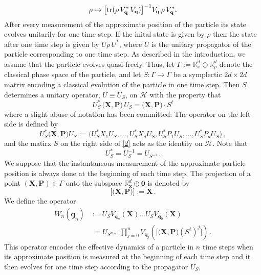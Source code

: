 \documentclass[12pt]{article}
\begin{document}
\begin{equation}\label{meas}
\rho \mapsto \big[ \text{tr}(\rho \,V_{\bf{q}}^{*}\, V_{\bf{q}})\big]^{-1} V_{\bf{q}}\, \rho\, V_{\bf{q}}^{*} .
\end{equation}
After every measurement of the approximate position of the particle its state evolves unitarily for one time step. If the 
inital state  is given by $\rho$ then the state after one time step is given by $U\rho\,U^{*}$, where $U$ is the unitary propagator of the particle corresponding to one time step. As described in the introduction, we assume that the particle evolves quasi-freely. Thus, let $\Gamma:= \mathbb{R}_{x}^{d}\oplus \mathbb{R}^{d}_{p}$ denote the classical phase space of the particle, and let $S: \Gamma \rightarrow \Gamma$ be a symplectic $2d \times 2d$ matrix encoding a 
classical evolution of the particle in one time step. Then $S$ determines a unitary operator, $U\equiv U_S$, on $\mathcal{H}$ with the property that
\begin{equation}\label{2}
U_{S}^{*}\,\big( \mathbf{X}, \mathbf{P} \big)\, U_{S}= \big(\mathbf{X}, \mathbf{P}\big)\cdot S^{t}
\end{equation}
where a slight abuse of notation has been committed: The operator on the left side is defined by
$$ U_S^{*} \big(\mathbf{X}, \mathbf{P} \big) U_{S}:= \Big(U_S^{*} X_1 U_S,\dots, U_S^{*} X_d U_S, 
U_S^{*} P_1 U_S, \dots, U_S^{*} P_d U_S\Big)\,,$$
and the matirx $S$ on the right side of \eqref{2} acts as the identity on $\mathcal{H}$. Note that 
$$U_S^{*}=U_S^{-1}=U_{S^{-1}}\,.$$
We suppose that the instantaneous measurement of the approximate particle position is always done at the beginning of each 
time step. The projection of a point $(\mathbf{X}, \mathbf{P})\in \Gamma$ onto the subspace 
$\mathbb{R}^{d}_{\mathbf{x}}\oplus{\mathbf{0}}$ is denoted by 
\begin{equation}\label{proj}
\big[\big(\mathbf{X}, \mathbf{P}\big)\big]:= \mathbf{X}\,. 
\end{equation}
We define the operator
\begin{align}\label{evolution}
W_{n}(\underline{\mathbf{q}}_{n})&:= U_S V_{\mathbf{q}_n}(\mathbf{X}) \dots U_S V_{\mathbf{q}_0}(\mathbf{X})\nonumber\\
 &\,\,= U_{S^{n+1}} \prod_{j=0}^{n} V_{\mathbf{q}_j}(\big[\big(\mathbf{X}, \mathbf{P}\big) (S^{t})^{j} \big])\,.
\end{align}
This operator encodes the effective dynamics of a particle in $n$ time steps when its approximate position 
is measured at the beginning of each time step and it then evolves for one time step according to the propagator $U_S$, 
\end{document}
